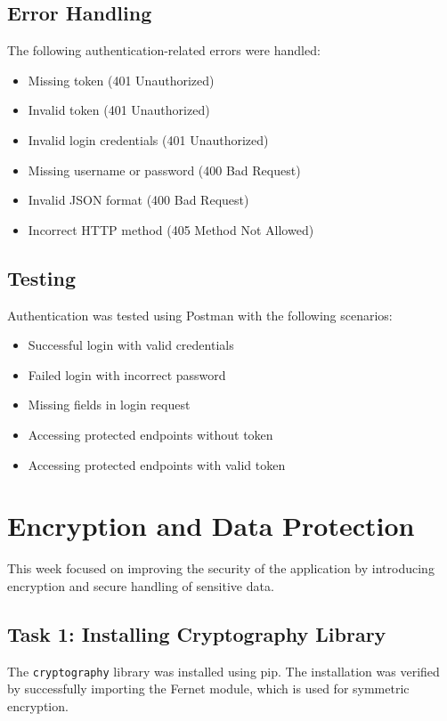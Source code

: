 \documentclass[12pt]{article}
\begin{document}
\subsection{Error Handling}
The following authentication-related errors were handled:
\begin{itemize}
\item Missing token (401 Unauthorized)
\item Invalid token (401 Unauthorized)
\item Invalid login credentials (401 Unauthorized)
\item Missing username or password (400 Bad Request)
\item Invalid JSON format (400 Bad Request)
\item Incorrect HTTP method (405 Method Not Allowed)
\end{itemize}

\subsection{Testing}
Authentication was tested using Postman with the following scenarios:
\begin{itemize}
\item Successful login with valid credentials
\item Failed login with incorrect password
\item Missing fields in login request
\item Accessing protected endpoints without token
\item Accessing protected endpoints with valid token
\end{itemize}

\section{Encryption and Data Protection}

This week focused on improving the security of the application by introducing encryption and secure handling of sensitive data.

\subsection{Task 1: Installing Cryptography Library}

The \texttt{cryptography} library was installed using pip. The installation was verified by successfully importing the Fernet module, which is used for symmetric encryption.
\end{document}
